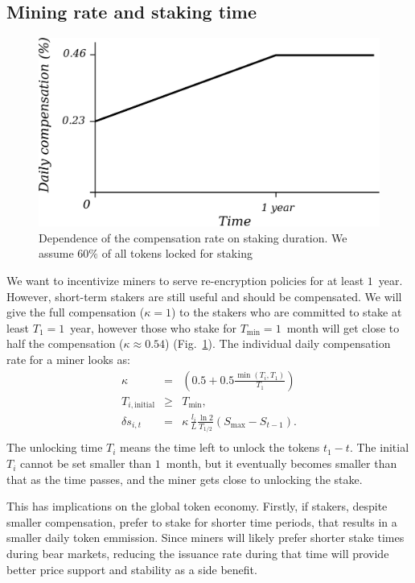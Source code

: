 \documentclass[longbibliography,nofootinbib,twocolumn]{revtex4-1}
\newcommand{\figref}[1]{Fig.~\ref{#1}}
\begin{document}
\subsection{Mining rate and staking time}

\begin{figure}
    \includegraphics[width=\columnwidth]{pdf/rate.pdf}
    \caption{Dependence of the compensation rate on staking duration. We assume $60\%$ of all tokens locked for staking}
    \label{fig:reward-rate-vs-duration}
\end{figure}

We want to incentivize miners to serve re-encryption policies for at least $1$~year.
However, short-term stakers are still useful and should be compensated.
We will give the full compensation ($\kappa=1$) to the stakers who are committed to stake at least $T_1=1$~year,
however those who stake for $T_{\min}=1$~month will get close to half the compensation ($\kappa\approx0.54$) (\figref{fig:reward-rate-vs-duration}).
The individual daily compensation rate for a miner looks as:
\begin{eqnarray}
    \kappa &=& \left(0.5 + 0.5\frac{\min(T_i, T_1)}{T_1}\right)\\
    T_{i,\text{initial}} &\ge& T_{\min},\\
    \delta s_{i,t} &=&  \kappa\, \frac{l_i}{L} \frac{\ln{2}}{T_{1/2}} \left( S_{\max} - S_{t-1}\right).\\
\end{eqnarray}
The unlocking time $T_i$ means the time left to unlock the tokens $t_1 - t$.
The initial $T_i$ cannot be set smaller than $1$~month,
but it eventually becomes smaller than that as the time passes, and the miner gets close to unlocking the stake.

This has implications on the global token economy.
Firstly, if stakers, despite smaller compensation, prefer to stake for shorter time periods, that results in a smaller daily token emmission.
Since miners will likely prefer shorter stake times during bear markets, reducing the issuance rate during that time will provide better price support and stability
as a side benefit.
\end{document}
